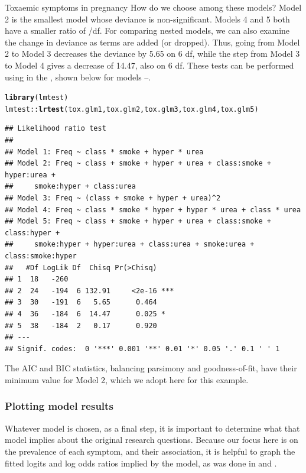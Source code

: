 \documentclass[11pt]{book}\usepackage[]{graphicx}\usepackage[]{color}
\makeatletter
\newcommand{\hlstd}[1]{\textcolor[rgb]{0.345,0.345,0.345}{#1}}%
\newcommand{\hlkwd}[1]{\textcolor[rgb]{0.737,0.353,0.396}{\textbf{#1}}}%
\newenvironment{kframe}{%
 \def\at@end@of@kframe{}%
 \ifinner\ifhmode%
  \def\at@end@of@kframe{\end{minipage}}%
  \begin{minipage}{\columnwidth}%
 \fi\fi%
 \def\FrameCommand##1{\hskip\@totalleftmargin \hskip-\fboxsep
 \colorbox{shadecolor}{##1}\hskip-\fboxsep
     \hskip-\linewidth \hskip-\@totalleftmargin \hskip\columnwidth}%
 \MakeFramed {\advance\hsize-\width
   \@totalleftmargin\z@ \linewidth\hsize
   \@setminipage}}%
 {\par\unskip\endMakeFramed%
 \at@end@of@kframe}
\newenvironment{knitrout}{}{} %
\renewenvironment{knitrout}{\small\renewcommand{\baselinestretch}{.85}}{} %
\makeatother
\begin{document}
\begin{Example}[toxaemia]{Toxaemic symptoms in pregnancy}
How do we choose among these models?  Model 2 is the smallest model whose deviance
is non-significant.
Models 4 and 5 both have a smaller ratio of \GSQ /df.
For comparing nested models, we can also examine the change in deviance as
terms are added (or dropped).  Thus, going from Model 2 to Model 3
decreases the deviance by 5.65 on 6 df,
while the step from Model 3 to Model 4
gives a decrease of 14.47, also on 6 df.
These tests can be performed using  in the ,
shown below for models --.
\begin{knitrout}\footnotesize
{}\color{fgcolor}\begin{kframe}
\begin{alltt}
\hlkwd{library}\hlstd{(lmtest)}
\hlstd{lmtest::}\hlkwd{lrtest}\hlstd{(tox.glm1, tox.glm2, tox.glm3, tox.glm4, tox.glm5)}
\end{alltt}
\begin{verbatim}
## Likelihood ratio test
## 
## Model 1: Freq ~ class * smoke + hyper * urea
## Model 2: Freq ~ class + smoke + hyper + urea + class:smoke + hyper:urea + 
##     smoke:hyper + class:urea
## Model 3: Freq ~ (class + smoke + hyper + urea)^2
## Model 4: Freq ~ class * smoke * hyper + hyper * urea + class * urea
## Model 5: Freq ~ class + smoke + hyper + urea + class:smoke + class:hyper + 
##     smoke:hyper + hyper:urea + class:urea + smoke:urea + class:smoke:hyper
##   #Df LogLik Df  Chisq Pr(>Chisq)    
## 1  18   -260                         
## 2  24   -194  6 132.91     <2e-16 ***
## 3  30   -191  6   5.65      0.464    
## 4  36   -184  6  14.47      0.025 *  
## 5  38   -184  2   0.17      0.920    
## ---
## Signif. codes:  0 '***' 0.001 '**' 0.01 '*' 0.05 '.' 0.1 ' ' 1
\end{verbatim}
\end{kframe}
\end{knitrout}
\noindent
The AIC  and BIC statistics, balancing
parsimony and goodness-of-fit, have their minimum value for Model 2,
which we adopt here for this example.

\subsubsection*{Plotting model results}
Whatever model is chosen, as a final step, it is important to determine what
that model implies about the original research questions.
Because our focus here is on the prevalence of each symptom, and their
association, it is helpful to graph the fitted logits and log odds ratios
implied by the model, as was done in  and .


\end{Example}
\end{document}
